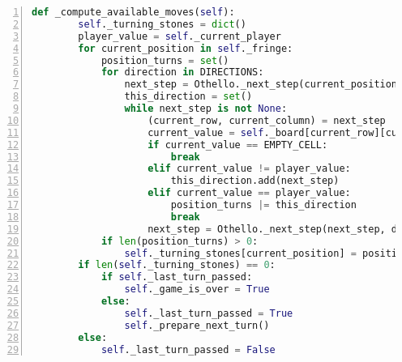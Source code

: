 \newpage
\begin{lstlisting}[basicstyle=\footnotesize, caption = {Die Funktion \code{\_compute\_available\_moves}}, language = python, captionpos = t , numbers=left, label={lst:fct-compute-available-moves}]
    def _compute_available_moves(self):
        self._turning_stones = dict()
        player_value = self._current_player
        for current_position in self._fringe:
            position_turns = set()
            for direction in DIRECTIONS:
                next_step = Othello._next_step(current_position, direction)
                this_direction = set()
                while next_step is not None:
                    (current_row, current_column) = next_step
                    current_value = self._board[current_row][current_column]
                    if current_value == EMPTY_CELL:
                        break
                    elif current_value != player_value:
                        this_direction.add(next_step)
                    elif current_value == player_value:
                        position_turns |= this_direction
                        break
                    next_step = Othello._next_step(next_step, direction)
            if len(position_turns) > 0:
                self._turning_stones[current_position] = position_turns
        if len(self._turning_stones) == 0:
            if self._last_turn_passed:
                self._game_is_over = True
            else:
                self._last_turn_passed = True
                self._prepare_next_turn()
        else:
            self._last_turn_passed = False
\end{lstlisting}
